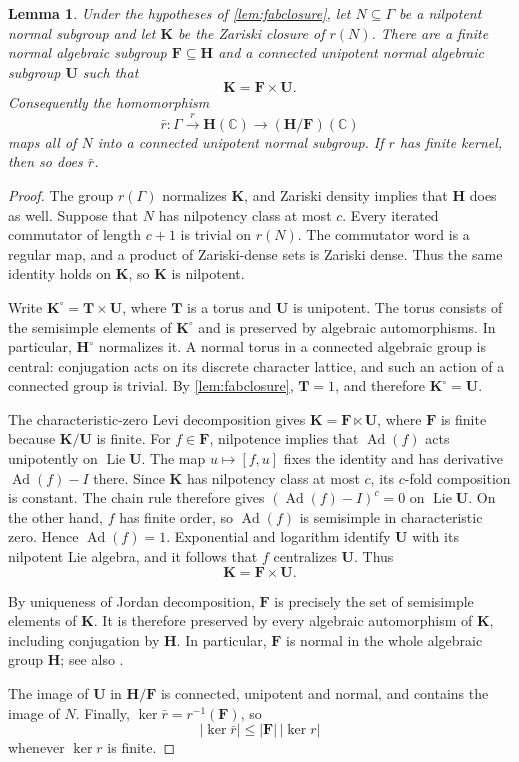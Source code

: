\documentclass[11pt,a4paper]{article}
\newtheorem{lemma}[theorem]{Lemma}
\theoremstyle{definition}
\newcommand{\C}{\mathbb C}
\newcommand{\Ad}{\operatorname{Ad}}
\newcommand{\Lie}{\operatorname{Lie}}
\begin{document}
\begin{lemma}\label{lem:unipotentization}
Under the hypotheses of \cref{lem:fabclosure}, let
\(N\subseteq\Gamma\) be a nilpotent normal subgroup and let \(\mathbf K\) be
the Zariski closure of \(r(N)\). There are a finite normal algebraic
subgroup \(\mathbf F\subseteq\mathbf H\) and a connected
unipotent normal algebraic subgroup \(\mathbf U\) such that
\[
 \mathbf K=\mathbf F\times\mathbf U.
\]
Consequently the homomorphism
\[
 \bar r:\Gamma\xrightarrow{r}\mathbf H(\C)
       \longrightarrow(\mathbf H/\mathbf F)(\C)
\]
maps all of \(N\) into a connected unipotent normal subgroup.
If \(r\) has finite kernel, then so does \(\bar r\).
\end{lemma}
\begin{proof}
The group \(r(\Gamma)\) normalizes \(\mathbf K\), and Zariski
density implies that \(\mathbf H\) does as well. Suppose that \(N\)
has nilpotency class at most \(c\). Every iterated commutator of
length \(c+1\) is trivial on \(r(N)\). The commutator word is a
regular map, and a product of Zariski-dense sets is Zariski dense.
Thus the same identity holds on \(\mathbf K\), so \(\mathbf K\)
is nilpotent.

Write \(\mathbf K^\circ=\mathbf T\times\mathbf U\), where
\(\mathbf T\) is a torus and \(\mathbf U\) is unipotent. The
torus consists of the semisimple elements of \(\mathbf K^\circ\)
and is preserved by algebraic automorphisms. In particular,
\(\mathbf H^\circ\) normalizes it. A normal torus in a connected
algebraic group is central: conjugation acts on its discrete character
lattice, and such an action of a connected group is trivial. By
\cref{lem:fabclosure}, \(\mathbf T=1\), and therefore
\(\mathbf K^\circ=\mathbf U\).

The characteristic-zero Levi decomposition gives
\(\mathbf K=\mathbf F\ltimes\mathbf U\), where \(\mathbf F\)
is finite because \(\mathbf K/\mathbf U\) is finite. For
\(f\in\mathbf F\), nilpotence implies that \(\Ad(f)\) acts
unipotently on \(\Lie\mathbf U\). The map \(u\mapsto[f,u]\)
fixes the identity and has derivative \(\Ad(f)-I\) there.
Since \(\mathbf K\) has nilpotency class at most \(c\), its
\(c\)-fold composition is constant. The chain rule therefore gives
\((\Ad(f)-I)^c=0\) on \(\Lie\mathbf U\).
On the other hand, \(f\) has finite order,
so \(\Ad(f)\) is semisimple in characteristic zero. Hence
\(\Ad(f)=1\). Exponential and logarithm identify \(\mathbf U\)
with its nilpotent Lie algebra, and it follows that \(f\) centralizes
\(\mathbf U\). Thus
\[
 \mathbf K=\mathbf F\times\mathbf U.
\]

By uniqueness of Jordan decomposition, \(\mathbf F\) is precisely
the set of semisimple elements of \(\mathbf K\). It is therefore
preserved by every algebraic automorphism of \(\mathbf K\), including
conjugation by \(\mathbf H\). In particular, \(\mathbf F\) is
normal in the whole algebraic group \(\mathbf H\); see also
\cite[Section~2.1 and Appendix~A]{Baues}.

The image of \(\mathbf U\) in \(\mathbf H/\mathbf F\) is
connected, unipotent and normal, and contains the image of \(N\).
Finally, \(\ker\bar r=r^{-1}(\mathbf F)\), so
\[
 |\ker\bar r|\le |\mathbf F|\,|\ker r|
\]
whenever \(\ker r\) is finite.
\end{proof}
\end{document}
